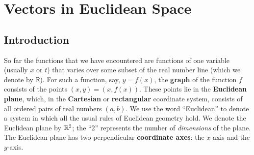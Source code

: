 \chapter{Vectors in Euclidean Space}


\section{Introduction}
So far the functions that we have encountered are functions of one variable (usually $x$ or $t$) 
that varies over some subset of the real number line (which we denote by $\mathbb{R}$).  For such a function, say,
$y = f(x)$, the \textbf{graph} of the function $f$ consists of the points $(x, y) = (x, f(x))$.  These points lie in
the \textbf{Euclidean plane}, which, in the \textbf{Cartesian} or
\textbf{rectangular} coordinate system, consists
of all ordered pairs of real numbers $(a, b)$.  We use the word ``Euclidean'' to denote a system in which all the
usual rules of Euclidean geometry hold.  We denote the Euclidean plane by $\mathbb{R}^{2}$;
the ``2'' represents
the number of \emph{dimensions} of the plane.  The Euclidean plane has two perpendicular
\textbf{coordinate axes}: the $x$-axis and the $y$-axis.

